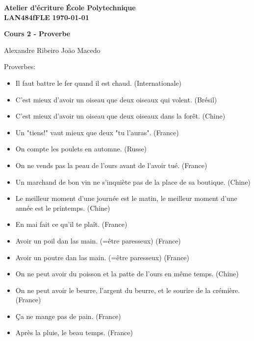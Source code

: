 \documentclass[10pt]{article} %
\newcommand{\createHeader}[5]{
	\noindent
	\normalsize\textbf{#2} \hfill \textbf{#1}\\
	\normalsize\textbf{#3} \hfill \textbf{\today}\vspace{20pt}
	\centerline{\Large \textbf{#5}}\vspace{3pt}
	\centerline{\normalsize #4}\vspace{20pt}}
\begin{document}
	\createHeader{École Polytechnique}{Atelier d'écriture}{LAN484fFLE}{Alexandre Ribeiro João Macedo}{Cours 2 - Proverbe}
	Proverbes:
	\begin{itemize}
		\item Il faut battre le fer quand il est chaud. (Internationale)
		\\
		\item C'est mieux d'avoir un oiseau que deux oiseaux qui volent. (Brésil)
		\item C'est mieux d'avoir un oiseau que deux oiseaux dans la forêt. (Chine)
		\item Un "tiens!" vaut mieux que deux "tu l'auras". (France)
		\\
		\item On compte les poulets en automne. (Russe)
		\item On ne vends pas la peau de l'ours avant de l'avoir tué. (France)
		\\
		\item Un marchand de bon vin ne s'inquiète pas de la place de sa boutique. (Chine)
		\\
		\item Le meilleur moment d'une journée est le matin, le meilleur moment d'une année est le printemps. (Chine)
		\item En mai fait ce qu'il te plaît. (France)
		\\
		\item Avoir un poil dan las main. (=être paresseux) (France)
		\item Avoir un poutre dan las main. (=être paresseux) (France)
		\\
		\item On ne peut avoir du poisson et la patte de l'ours en même temps. (Chine)
		\item On ne peut avoir le beurre, l'argent du beurre, et le sourire de la crémière. (France) 
		\\
		\item Ça ne mange pas de pain. (France)
		\\
		\item Après la pluie, le beau temps. (France)
	\end{itemize}
\end{document}
